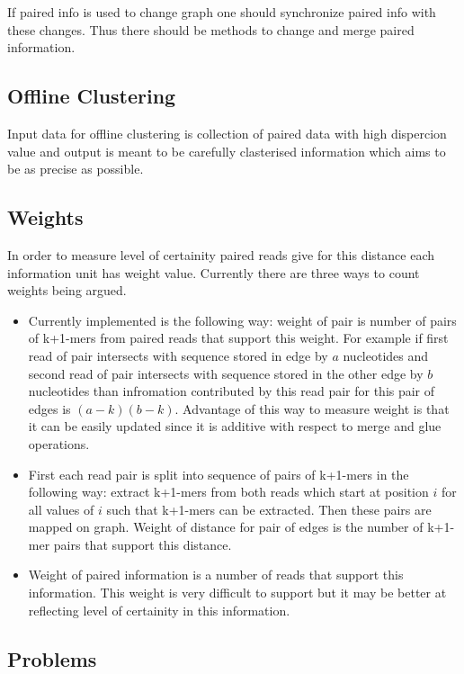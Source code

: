 \documentclass[14pt]{article}
\begin{document}
If paired info is used to change graph one should synchronize paired info with these changes. Thus there should be methods to change and merge paired information.

\subsection{Offline Clustering}

Input data for offline clustering is collection of paired data with high dispercion value and output is meant to be carefully clasterised information which aims to be as precise as possible.

\subsection{Weights}
In order to measure level of certainity paired reads give for this distance each information unit has weight value. Currently there are three ways to count weights being argued.

\begin{itemize}
\item Currently implemented is the following way: weight of pair is number of pairs of k+1-mers from paired reads that support this weight. For example if first read of pair intersects with sequence stored in edge by $a$ nucleotides and second read of pair intersects with sequence stored in the other edge by $b$ nucleotides than infromation contributed by this read pair for this pair of edges is $(a - k)(b - k)$. Advantage of this way to measure weight is that it can be easily updated since it is additive with respect to merge and glue operations.
\item First each read pair is split into sequence of pairs of k+1-mers in the following way: extract k+1-mers from both reads which start at position $i$ for all values of $i$ such that k+1-mers can be extracted. Then these pairs are mapped on graph. Weight of distance for pair of edges is the number of k+1-mer pairs that support this distance.
\item Weight of paired information is a number of reads that support this information. This weight is very difficult to support but it may be better at reflecting level of certainity in this information.
\end{itemize}

\subsection{Problems}
\end{document}
